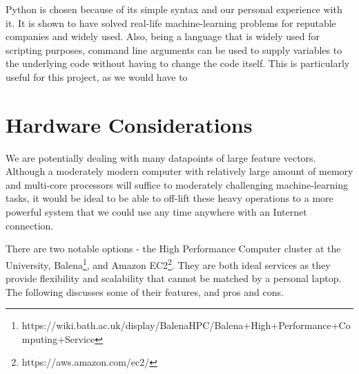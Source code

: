 Python is chosen because of its simple syntax and our personal experience with it. It is shown to have solved real-life machine-learning problems for reputable companies and widely used. Also, being a language that is widely used for scripting purposes, command line arguments can be used to supply variables to the underlying code without having to change the code itself. This is particularly useful for this project, as we would have to 

\section{Hardware Considerations}
We are potentially dealing with many datapoints of large feature vectors. Although a moderately modern computer with relatively large amount of memory and multi-core processors will suffice to moderately challenging machine-learning tasks, it would be ideal to be able to off-lift these heavy operations to a more powerful system that we could use any time anywhere with an Internet connection.

There are two notable options - the High Performance Computer cluster at the University, Balena\footnote{https://wiki.bath.ac.uk/display/BalenaHPC/Balena+High+Performance+Computing+Service}, and Amazon EC2\footnote{https://aws.amazon.com/ec2/}. They are both ideal services as they provide flexibility and scalability that cannot be matched by a personal laptop. The following discusses some of their features, and pros and cons.


